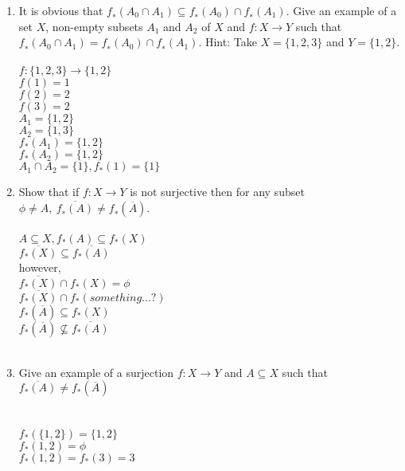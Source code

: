 \documentclass[11pt]{article}
\begin{document}
\begin{enumerate}
\begin{enumerate}
\item It is obvious that $f_∗(A_0 \cap A_1) \subseteq f_∗(A_0) \cap f_∗(A_1)$.  Give an
example of a set $X$, non-empty subsets $A_1$ and $A_2$ of $X$ and
$f : X \to Y$ such that $f_∗(A_0 \cap A_1) = f_∗(A_0) \cap f_∗(A_1)$. Hint:
Take $X = \{1, 2, 3\}$ and $Y = \{1, 2\}$.
\\ \\
$f: \{1,2,3\} \to \{1,2\}$\\
$f(1) = 1$\\
$f(2) = 2$\\
$f(3) = 2$\\
$A_1 = \{1,2\}$\\
$A_2 = \{1,3\}$\\
$f_*(A_1) = \{1,2\}$\\
$f_*(A_2) = \{1,2\}$\\
$A_1 \cap A_2 = \{1\}, f_*(1) = \{1\}$\\

\item Show that if $f : X \to Y$ is not surjective then for any subset $\phi \neq A,\   \overline{f_∗(A)} \neq f_∗(\overline{A})$.\\
\\
$A \subseteq X, f_*(A) \subseteq f_*(X)$\\
$\overline{f_*(X)} \subseteq \overline{f_*(A)}$\\
however,\\
$\overline{f_*(X)} \cap f_*(X) = \phi$\\
$\overline{f_*(X)} \cap f_*(something . . .?)$\\
$f_*(\overline{A}) \subseteq f_*(X)$\\
$f_*(\overline{A}) \nsubseteq \overline{f_*(A)}$\\
\\
\item Give an example of a surjection $f: X \to Y$ and $A \subseteq X$ such that $\overline{f_*(A)} \neq f_*(\overline{A})$\\
\\
\\
$f_*(\{1,2\}) = \{1,2\}$\\
$f_*(1,2) = \phi$\\
$f_*(1,2) = f_*(3) = 3$
\end{enumerate}

\end{enumerate} %
\end{document}
